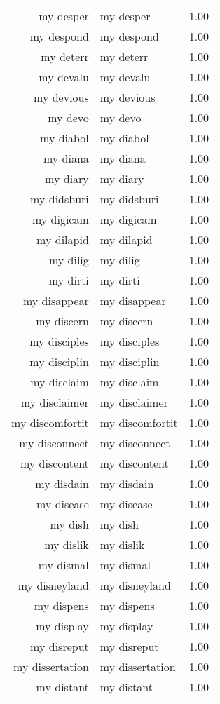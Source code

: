 \begin{table}[ht]
\begin{tabular}{rlr}
  my desper & my desper & 1.00 \\ 
  my despond & my despond & 1.00 \\ 
  my deterr & my deterr & 1.00 \\ 
  my devalu & my devalu & 1.00 \\ 
  my devious & my devious & 1.00 \\ 
  my devo & my devo & 1.00 \\ 
  my diabol & my diabol & 1.00 \\ 
  my diana & my diana & 1.00 \\ 
  my diary & my diary & 1.00 \\ 
  my didsburi & my didsburi & 1.00 \\ 
  my digicam & my digicam & 1.00 \\ 
  my dilapid & my dilapid & 1.00 \\ 
  my dilig & my dilig & 1.00 \\ 
  my dirti & my dirti & 1.00 \\ 
  my disappear & my disappear & 1.00 \\ 
  my discern & my discern & 1.00 \\ 
  my disciples & my disciples & 1.00 \\ 
  my disciplin & my disciplin & 1.00 \\ 
  my disclaim & my disclaim & 1.00 \\ 
  my disclaimer & my disclaimer & 1.00 \\ 
  my discomfortit & my discomfortit & 1.00 \\ 
  my disconnect & my disconnect & 1.00 \\ 
  my discontent & my discontent & 1.00 \\ 
  my disdain & my disdain & 1.00 \\ 
  my disease & my disease & 1.00 \\ 
  my dish & my dish & 1.00 \\ 
  my dislik & my dislik & 1.00 \\ 
  my dismal & my dismal & 1.00 \\ 
  my disneyland & my disneyland & 1.00 \\ 
  my dispens & my dispens & 1.00 \\ 
  my display & my display & 1.00 \\ 
  my disreput & my disreput & 1.00 \\ 
  my dissertation & my dissertation & 1.00 \\ 
  my distant & my distant & 1.00 \\ 

\end{tabular}
\end{table}
